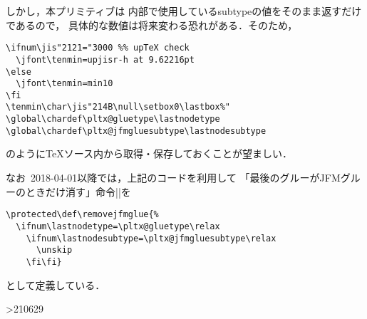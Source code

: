 \documentclass[a4paper,11pt,nomag,dvipdfmx]{jsarticle}
\begin{document}
しかし，本プリミティブは
\epTeX 内部で使用しているsubtypeの値をそのまま返すだけであるので，
具体的な数値は将来変わる恐れがある．そのため，
\begin{verbatim}
\ifnum\jis"2121="3000 %% upTeX check
  \jfont\tenmin=upjisr-h at 9.62216pt
\else
  \jfont\tenmin=min10
\fi
\tenmin\char\jis"214B\null\setbox0\lastbox%"
\global\chardef\pltx@gluetype\lastnodetype
\global\chardef\pltx@jfmgluesubtype\lastnodesubtype
\end{verbatim}
のように\TeX ソース内から取得・保存しておくことが望ましい．

\medskip
なお\pLaTeX~2018-04-01以降では，上記のコードを利用して
「最後のグルーがJFMグルーのときだけ消す」命令|\removejfmglue|を
\begin{verbatim}
\protected\def\removejfmglue{%
  \ifnum\lastnodetype=\pltx@gluetype\relax
    \ifnum\lastnodesubtype=\pltx@jfmgluesubtype\relax
      \unskip
    \fi\fi}
\end{verbatim}
として定義している．

\ifnum\epTeXversion>210629
\end{document}
